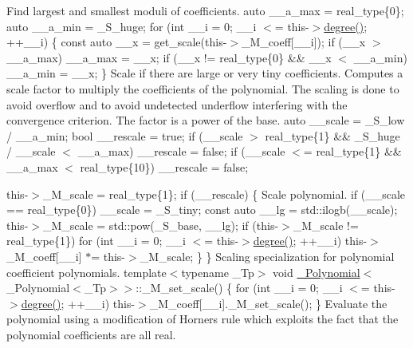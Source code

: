Find largest and smallest moduli of coefficients. auto \+\_\+\+\_\+a\+\_\+max = real\+\_\+type\{0\}; auto \+\_\+\+\_\+a\+\_\+min = \+\_\+\+S\+\_\+huge; for (int \+\_\+\+\_\+i = 0; \+\_\+\+\_\+i $<$= this-\/$>$\hyperlink{class____gnu__cxx_1_1__Polynomial_a07d9933aeeb9afbd823218ed921336cb}{degree()}; ++\+\_\+\+\_\+i) \{ const auto \+\_\+\+\_\+x = get\+\_\+scale(this-\/$>$\+\_\+\+M\+\_\+coeff\mbox{[}\+\_\+\+\_\+i\mbox{]}); if (\+\_\+\+\_\+x $>$ \+\_\+\+\_\+a\+\_\+max) \+\_\+\+\_\+a\+\_\+max = \+\_\+\+\_\+x; if (\+\_\+\+\_\+x != real\+\_\+type\{0\} \&\& \+\_\+\+\_\+x $<$ \+\_\+\+\_\+a\+\_\+min) \+\_\+\+\_\+a\+\_\+min = \+\_\+\+\_\+x; \} Scale if there are large or very tiny coefficients. Computes a scale factor to multiply the coefficients of the polynomial. The scaling is done to avoid overflow and to avoid undetected underflow interfering with the convergence criterion. The factor is a power of the base. auto \+\_\+\+\_\+scale = \+\_\+\+S\+\_\+low / \+\_\+\+\_\+a\+\_\+min; bool \+\_\+\+\_\+rescale = true; if (\+\_\+\+\_\+scale $>$ real\+\_\+type\{1\} \&\& \+\_\+\+S\+\_\+huge / \+\_\+\+\_\+scale $<$ \+\_\+\+\_\+a\+\_\+max) \+\_\+\+\_\+rescale = false; if (\+\_\+\+\_\+scale $<$= real\+\_\+type\{1\} \&\& \+\_\+\+\_\+a\+\_\+max $<$ real\+\_\+type\{10\}) \+\_\+\+\_\+rescale = false;

this-\/$>$\+\_\+\+M\+\_\+scale = real\+\_\+type\{1\}; if (\+\_\+\+\_\+rescale) \{ Scale polynomial. if (\+\_\+\+\_\+scale == real\+\_\+type\{0\}) \+\_\+\+\_\+scale = \+\_\+\+S\+\_\+tiny; const auto \+\_\+\+\_\+lg = std\+::ilogb(\+\_\+\+\_\+scale); this-\/$>$\+\_\+\+M\+\_\+scale = std\+::pow(\+\_\+\+S\+\_\+base, \+\_\+\+\_\+lg); if (this-\/$>$\+\_\+\+M\+\_\+scale != real\+\_\+type\{1\}) for (int \+\_\+\+\_\+i = 0; \+\_\+\+\_\+i $<$= this-\/$>$\hyperlink{class____gnu__cxx_1_1__Polynomial_a07d9933aeeb9afbd823218ed921336cb}{degree()}; ++\+\_\+\+\_\+i) this-\/$>$\+\_\+\+M\+\_\+coeff\mbox{[}\+\_\+\+\_\+i\mbox{]} $\ast$= this-\/$>$\+\_\+\+M\+\_\+scale; \} \} Scaling specialization for polynomial coefficient polynomials. template$<$typename \+\_\+\+Tp$>$ void \hyperlink{class____gnu__cxx_1_1__Polynomial}{\+\_\+\+Polynomial}$<$\+\_\+\+Polynomial$<$\+\_\+\+Tp$>$$>$\+::\+\_\+\+M\+\_\+set\+\_\+scale() \{ for (int \+\_\+\+\_\+i = 0; \+\_\+\+\_\+i $<$= this-\/$>$\hyperlink{class____gnu__cxx_1_1__Polynomial_a07d9933aeeb9afbd823218ed921336cb}{degree()}; ++\+\_\+\+\_\+i) this-\/$>$\+\_\+\+M\+\_\+coeff\mbox{[}\+\_\+\+\_\+i\mbox{]}.\+\_\+\+M\+\_\+set\+\_\+scale(); \} Evaluate the polynomial using a modification of Horner\textquotesingle{}s rule which exploits the fact that the polynomial coefficients are all real.

